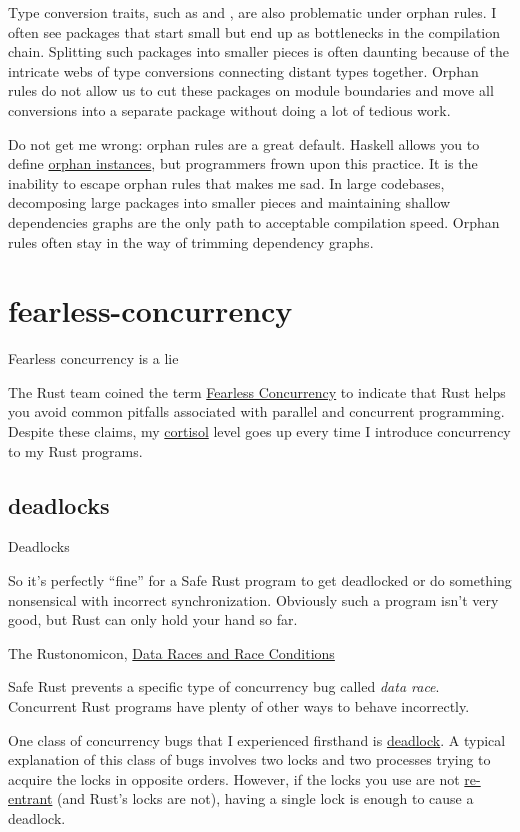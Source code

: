 \documentclass{article}
\begin{document}
Type conversion traits, such as  and , are also problematic under orphan rules.
I often see  packages that start small but end up as bottlenecks in the compilation chain.
Splitting such packages into smaller pieces is often daunting because of the intricate webs of type conversions connecting distant types together.
Orphan rules do not allow us to cut these packages on module boundaries and move all conversions into a separate package without doing a lot of tedious work.

Do not get me wrong: orphan rules are a great default.
Haskell allows you to define \href{https://wiki.haskell.org/Orphan_instance}{orphan instances}, but programmers frown upon this practice.
It is the inability to escape orphan rules that makes me sad.
In large codebases, decomposing large packages into smaller pieces and maintaining shallow dependencies graphs are the only path to acceptable compilation speed.
Orphan rules often stay in the way of trimming dependency graphs.

\section{fearless-concurrency}{Fearless concurrency is a lie}

The Rust team coined the term \href{https://blog.rust-lang.org/2015/04/10/Fearless-Concurrency.html}{Fearless Concurrency} to indicate that Rust helps you avoid common pitfalls associated with parallel and concurrent programming.
Despite these claims, my \href{https://en.wikipedia.org/wiki/Cortisol}{cortisol} level goes up every time I introduce concurrency to my Rust programs.

\subsection{deadlocks}{Deadlocks}
\epigraph{
    So it's perfectly ``fine'' for a Safe Rust program to get deadlocked or do something nonsensical with incorrect synchronization.
    Obviously such a program isn't very good, but Rust can only hold your hand so far.
}{The Rustonomicon, \href{https://doc.rust-lang.org/nomicon/races.html}{Data Races and Race Conditions}}

Safe Rust prevents a specific type of concurrency bug called \emph{data race}.
Concurrent Rust programs have plenty of other ways to behave incorrectly.

One class of concurrency bugs that I experienced firsthand is \href{https://en.wikipedia.org/wiki/Deadlock}{deadlock}.
A typical explanation of this class of bugs involves two locks and two processes trying to acquire the locks in opposite orders.
However, if the locks you use are not \href{https://stackoverflow.com/questions/1312259/what-is-the-re-entrant-lock-and-concept-in-general}{re-entrant} (and Rust's locks are not), having a single lock is enough to cause a deadlock.
\end{document}
